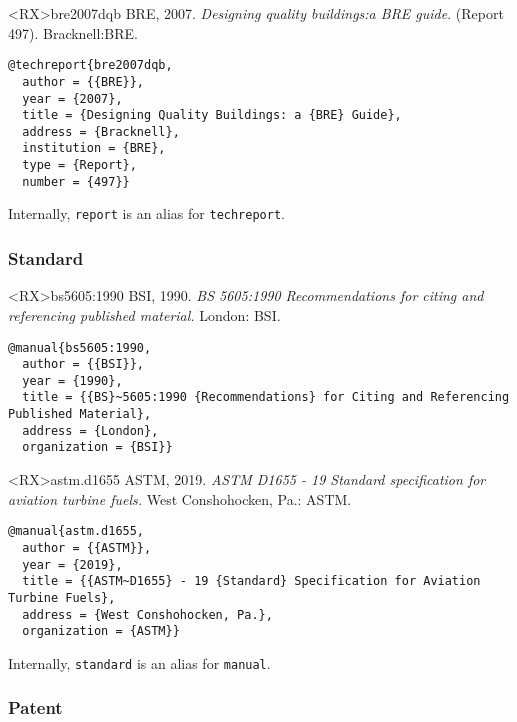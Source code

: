 \documentclass[10pt,a4paper]{article}
\newenvironment{info}{%
  \begin{list}{\makebox[2em][c]{\faInfoCircle}}{%
    \setlength{\leftmargin}{2em}
    \setlength{\labelwidth}{2em}
    \setlength{\labelsep}{0pt}}
}{\end{list}}
\begin{document}
\begin{bibexbox}<RX>{bre2007dqb}
  BRE, 2007. \emph{Designing quality buildings:\@ a BRE guide}. (Report 497). Bracknell:\@ BRE.
  \tcblower
\begin{Verbatim}
@techreport{bre2007dqb,
  author = {{BRE}},
  year = {2007},
  title = {Designing Quality Buildings: a {BRE} Guide},
  address = {Bracknell},
  institution = {BRE},
  type = {Report},
  number = {497}}
\end{Verbatim}
\end{bibexbox}

\begin{info}\item Internally, \texttt{report} is an alias for \texttt{techreport}.\end{info}

\subsubsection*{Standard}

\begin{bibexbox}<RX>{bs5605:1990}
  BSI, 1990. \emph{BS 5605:1990 Recommendations for citing and referencing
  published material.} London: BSI.
  \tcblower
\begin{Verbatim}
@manual{bs5605:1990,
  author = {{BSI}},
  year = {1990},
  title = {{BS}~5605:1990 {Recommendations} for Citing and Referencing Published Material},
  address = {London},
  organization = {BSI}}
\end{Verbatim}
\end{bibexbox}

\begin{bibexbox}<RX>{astm.d1655}
  ASTM, 2019. \emph{ASTM D1655 - 19 Standard specification for aviation
  turbine fuels.} West Conshohocken, Pa.: ASTM.
  \tcblower
\begin{Verbatim}
@manual{astm.d1655,
  author = {{ASTM}},
  year = {2019},
  title = {{ASTM~D1655} - 19 {Standard} Specification for Aviation Turbine Fuels},
  address = {West Conshohocken, Pa.},
  organization = {ASTM}}
\end{Verbatim}
\end{bibexbox}

\begin{info}\item Internally, \texttt{standard} is an alias for \texttt{manual}.\end{info}

\subsubsection*{Patent}
\end{document}
